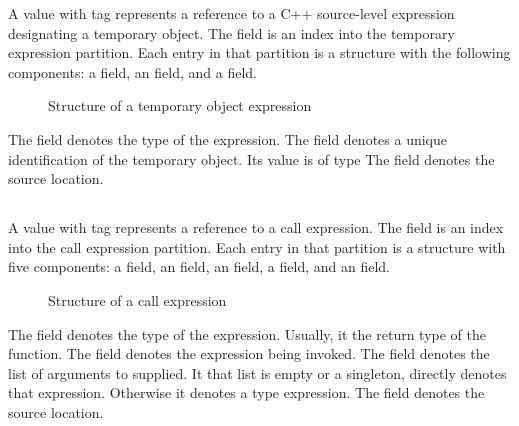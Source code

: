 A  value with tag  represents a
reference to a C++ source-level expression designating a temporary object.
The  field is an index into the temporary expression partition.
Each entry in that partition is a structure with the following components: a  field, an  field, and a  field.
%
\begin{figure}[H]
	\centering
	\caption{Structure of a temporary object expression}
	\label{fig:ifc-temporary-expression-structure}
\end{figure}
%
The  field denotes the type of the expression.
The  field denotes a unique identification of the temporary object.
Its value is of type 
The  field denotes the source location.


\subsection{}
\label{sec:ifc:ExprSort:Call}

A  value with tag  represents
a reference to a call expression.
The  field is an index into the call expression partition.
Each entry in that partition is a structure with five components: a  field, an  field, an  field,
a  field, and an  field.
%
\begin{figure}[H]
	\centering
	\caption{Structure of a call expression}
	\label{fig:ifc-call-expression-structure}
\end{figure}
%
The  field denotes the type of the expression.  Usually, it the return type of the function.
The  field denotes the expression being invoked.
The  field denotes the list of arguments to supplied. It that list is empty or a singleton,  directly denotes that expression.
Otherwise it denotes a type expression.
The  field denotes the source location.

